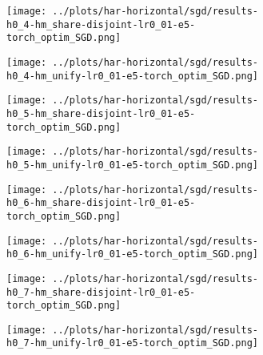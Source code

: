 \begin{figure}[htbp]  %
    \centering
    \begin{subfigure}[b]{0.47\textwidth}
        \centering
        \texttt{[image: ../plots/har-horizontal/sgd/results-h0\_4-hm\_share-disjoint-lr0\_01-e5-torch\_optim\_SGD.png]}
    \end{subfigure}
    \hfill
    \begin{subfigure}[b]{0.47\textwidth}
        \centering
        \texttt{[image: ../plots/har-horizontal/sgd/results-h0\_4-hm\_unify-lr0\_01-e5-torch\_optim\_SGD.png]}
    \end{subfigure}
\end{figure}
\begin{figure}[htbp]  %
    \centering
    \begin{subfigure}[b]{0.47\textwidth}
        \centering
        \texttt{[image: ../plots/har-horizontal/sgd/results-h0\_5-hm\_share-disjoint-lr0\_01-e5-torch\_optim\_SGD.png]}
    \end{subfigure}
    \hfill
    \begin{subfigure}[b]{0.47\textwidth}
        \centering
        \texttt{[image: ../plots/har-horizontal/sgd/results-h0\_5-hm\_unify-lr0\_01-e5-torch\_optim\_SGD.png]}
    \end{subfigure}
\end{figure}
\begin{figure}[htbp]  %
    \centering
    \begin{subfigure}[b]{0.47\textwidth}
        \centering
        \texttt{[image: ../plots/har-horizontal/sgd/results-h0\_6-hm\_share-disjoint-lr0\_01-e5-torch\_optim\_SGD.png]}
    \end{subfigure}
    \hfill
    \begin{subfigure}[b]{0.47\textwidth}
        \centering
        \texttt{[image: ../plots/har-horizontal/sgd/results-h0\_6-hm\_unify-lr0\_01-e5-torch\_optim\_SGD.png]}
    \end{subfigure}
\end{figure}
\begin{figure}[htbp]  %
    \centering
    \begin{subfigure}[b]{0.47\textwidth}
        \centering
        \texttt{[image: ../plots/har-horizontal/sgd/results-h0\_7-hm\_share-disjoint-lr0\_01-e5-torch\_optim\_SGD.png]}
    \end{subfigure}
    \hfill
    \begin{subfigure}[b]{0.47\textwidth}
        \centering
        \texttt{[image: ../plots/har-horizontal/sgd/results-h0\_7-hm\_unify-lr0\_01-e5-torch\_optim\_SGD.png]}
    \end{subfigure}
\end{figure}

